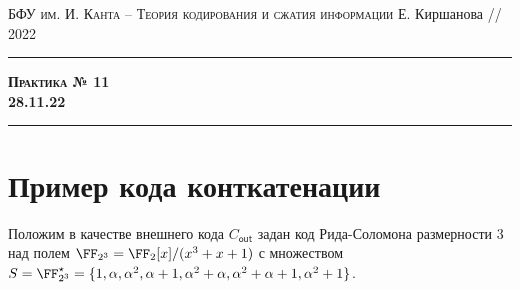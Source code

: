 \documentclass[11pt]{exam}
\theoremstyle{definition}
\begin{document}
	{\noindent
		\textsc{БФУ им. И. Канта -- Теория кодирования и сжатия информации}
		\hfill {Е. Киршанова // 2022\\}
	\hrule
	\begin{center}
		{\Large\textbf{
				\textsc{Практика № 11} \\[5pt] {28.11.22}
		} } 
	\end{center}
	\hrule \vspace{5mm}
	
	\thispagestyle{empty}
	
	\vspace{0.2cm}
	

	
%
		
	
%			
% 		
 		
 
\section{Пример кода конткатенации}

\begin{questions}
	
	\question Положим в качестве внешнего кода $C_{\mathsf{out}}$ задан код Рида-Соломона размерности 3 над полем $\FF_{2^3} = \FF_2[x]/(x^3+x+1)$ с множеством $S =\FF_{2^3}^\star  = \{ 1, \alpha, \alpha^2, \alpha+1, \alpha^2+\alpha, \alpha^2+\alpha+1, \alpha^2+1  \}$.
	

\end{questions}}
\end{document}
